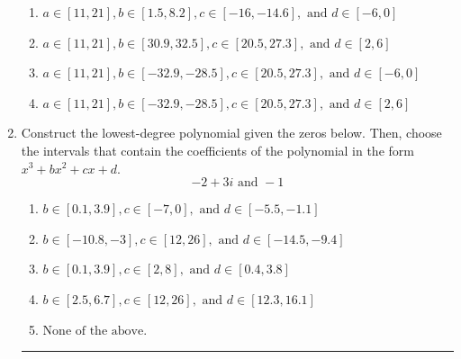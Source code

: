 \documentclass[14pt]{extbook}
\newcommand{\litem}[1]{\item#1\hspace*{-1cm}\rule{\textwidth}{0.4pt}}
\begin{document}
\begin{enumerate}
{\begin{enumerate}[label=\Alph*.]
\item \( a \in [11, 21], b \in [1.5, 8.2], c \in [-16, -14.6], \text{ and } d \in [-6, 0] \)
\item \( a \in [11, 21], b \in [30.9, 32.5], c \in [20.5, 27.3], \text{ and } d \in [2, 6] \)
\item \( a \in [11, 21], b \in [-32.9, -28.5], c \in [20.5, 27.3], \text{ and } d \in [-6, 0] \)
\item \( a \in [11, 21], b \in [-32.9, -28.5], c \in [20.5, 27.3], \text{ and } d \in [2, 6] \)

\end{enumerate} }
\litem{
Construct the lowest-degree polynomial given the zeros below. Then, choose the intervals that contain the coefficients of the polynomial in the form $x^3+bx^2+cx+d$.\[ -2 + 3 i \text{ and } -1 \]\begin{enumerate}[label=\Alph*.]
\item \( b \in [0.1, 3.9], c \in [-7, 0], \text{ and } d \in [-5.5, -1.1] \)
\item \( b \in [-10.8, -3], c \in [12, 26], \text{ and } d \in [-14.5, -9.4] \)
\item \( b \in [0.1, 3.9], c \in [2, 8], \text{ and } d \in [0.4, 3.8] \)
\item \( b \in [2.5, 6.7], c \in [12, 26], \text{ and } d \in [12.3, 16.1] \)
\item \( \text{None of the above.} \)

\end{enumerate} }
\end{enumerate}
\end{document}
